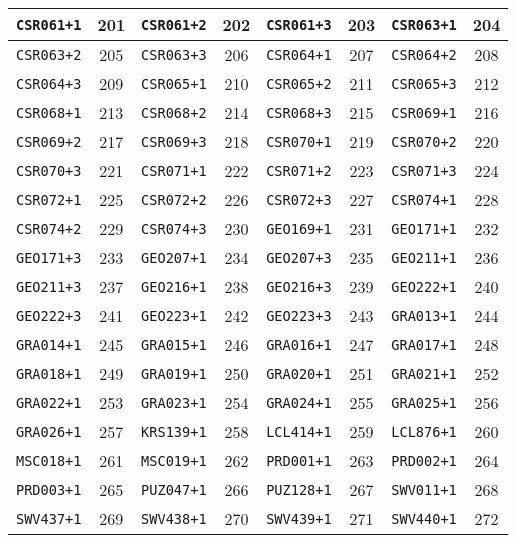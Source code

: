 \begin{table}[H]
{\begin{tabular}{|c|c|c|c|c|c|c|c|}
\hline
\texttt{CSR061+1} & 201 & \texttt{CSR061+2} & 202 & \texttt{CSR061+3} & 203 & \texttt{CSR063+1} & 204\\
\hline
\texttt{CSR063+2} & 205 & \texttt{CSR063+3} & 206 & \texttt{CSR064+1} & 207 & \texttt{CSR064+2} & 208\\
\hline
\texttt{CSR064+3} & 209 & \texttt{CSR065+1} & 210 & \texttt{CSR065+2} & 211 & \texttt{CSR065+3} & 212\\
\hline
\texttt{CSR068+1} & 213 & \texttt{CSR068+2} & 214 & \texttt{CSR068+3} & 215 & \texttt{CSR069+1} & 216\\
\hline
\texttt{CSR069+2} & 217 & \texttt{CSR069+3} & 218 & \texttt{CSR070+1} & 219 & \texttt{CSR070+2} & 220\\
\hline
\texttt{CSR070+3} & 221 & \texttt{CSR071+1} & 222 & \texttt{CSR071+2} & 223 & \texttt{CSR071+3} & 224\\
\hline
\texttt{CSR072+1} & 225 & \texttt{CSR072+2} & 226 & \texttt{CSR072+3} & 227 & \texttt{CSR074+1} & 228\\
\hline
\texttt{CSR074+2} & 229 & \texttt{CSR074+3} & 230 & \texttt{GEO169+1} & 231 & \texttt{GEO171+1} & 232\\
\hline
\texttt{GEO171+3} & 233 & \texttt{GEO207+1} & 234 & \texttt{GEO207+3} & 235 & \texttt{GEO211+1} & 236\\
\hline
\texttt{GEO211+3} & 237 & \texttt{GEO216+1} & 238 & \texttt{GEO216+3} & 239 & \texttt{GEO222+1} & 240\\
\hline
\texttt{GEO222+3} & 241 & \texttt{GEO223+1} & 242 & \texttt{GEO223+3} & 243 & \texttt{GRA013+1} & 244\\
\hline
\texttt{GRA014+1} & 245 & \texttt{GRA015+1} & 246 & \texttt{GRA016+1} & 247 & \texttt{GRA017+1} & 248\\
\hline
\texttt{GRA018+1} & 249 & \texttt{GRA019+1} & 250 & \texttt{GRA020+1} & 251 & \texttt{GRA021+1} & 252\\
\hline
\texttt{GRA022+1} & 253 & \texttt{GRA023+1} & 254 & \texttt{GRA024+1} & 255 & \texttt{GRA025+1} & 256\\
\hline
\texttt{GRA026+1} & 257 & \texttt{KRS139+1} & 258 & \texttt{LCL414+1} & 259 & \texttt{LCL876+1} & 260\\
\hline
\texttt{MSC018+1} & 261 & \texttt{MSC019+1} & 262 & \texttt{PRD001+1} & 263 & \texttt{PRD002+1} & 264\\
\hline
\texttt{PRD003+1} & 265 & \texttt{PUZ047+1} & 266 & \texttt{PUZ128+1} & 267 & \texttt{SWV011+1} & 268\\
\hline
\texttt{SWV437+1} & 269 & \texttt{SWV438+1} & 270 & \texttt{SWV439+1} & 271 & \texttt{SWV440+1} & 272\\

\end{tabular}}
\end{table}
